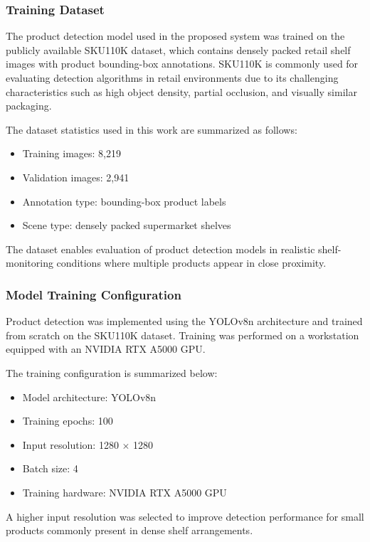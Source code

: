 \documentclass[conference]{IEEEtran}
\begin{document}
\subsubsection{Training Dataset}

The product detection model used in the proposed system was trained on the publicly available SKU110K dataset, which contains densely packed retail shelf images with product bounding-box annotations. SKU110K is commonly used for evaluating detection algorithms in retail environments due to its challenging characteristics such as high object density, partial occlusion, and visually similar packaging.

The dataset statistics used in this work are summarized as follows:

\begin{itemize}
\item Training images: 8,219
\item Validation images: 2,941
\item Annotation type: bounding-box product labels
\item Scene type: densely packed supermarket shelves
\end{itemize}

The dataset enables evaluation of product detection models in realistic shelf-monitoring conditions where multiple products appear in close proximity.

\subsubsection{Model Training Configuration}

Product detection was implemented using the YOLOv8n architecture and trained from scratch on the SKU110K dataset. Training was performed on a workstation equipped with an NVIDIA RTX A5000 GPU.

The training configuration is summarized below:

\begin{itemize}
\item Model architecture: YOLOv8n
\item Training epochs: 100
\item Input resolution: 1280 $\times$ 1280
\item Batch size: 4
\item Training hardware: NVIDIA RTX A5000 GPU
\end{itemize}

A higher input resolution was selected to improve detection performance for small products commonly present in dense shelf arrangements.
\end{document}
